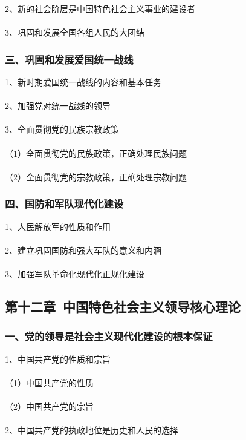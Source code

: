 \documentclass{ctexart}
\begin{document}
2、新的社会阶层是中国特色社会主义事业的建设者
\\\\

3、巩固和发展全国各组人民的大团结

\subsubsection{三、巩固和发展爱国统一战线}
1、新时期爱国统一战线的内容和基本任务
\\\\

2、加强党对统一战线的领导
\\\\

3、全面贯彻党的民族宗教政策
\\\\
（1）全面贯彻党的民族政策，正确处理民族问题
\\\\
（2）全面贯彻党的宗教政策，正确处理宗教问题

\subsubsection{四、国防和军队现代化建设}
1、人民解放军的性质和作用
\\\\

2、建立巩固国防和强大军队的意义和内涵
\\\\

3、加强军队革命化现代化正规化建设

\subsection{第十二章\ 中国特色社会主义领导核心理论}
\subsubsection{一、党的领导是社会主义现代化建设的根本保证}
1、中国共产党的性质和宗旨
\\\\
（1）中国共产党的性质
\\\\
（2）中国共产党的宗旨
\\\\

2、中国共产党的执政地位是历史和人民的选择
\\\\
\end{document}
